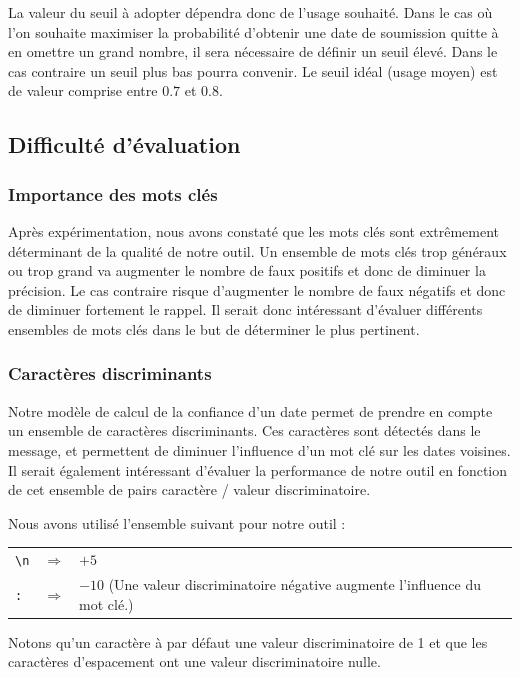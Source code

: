 \documentclass[a4paper,french,10pt]{article}
\begin{document}
La valeur du seuil à adopter dépendra donc de l'usage souhaité. Dans le cas où l'on souhaite maximiser la probabilité d'obtenir une date de soumission quitte à en omettre un grand nombre, il sera nécessaire de définir un seuil élevé. Dans le cas contraire un seuil plus bas pourra convenir. Le seuil idéal (usage moyen) est de valeur comprise entre $0.7$ et $0.8$.

\subsection{Difficulté d'évaluation}

\subsubsection{Importance des mots clés}
Après expérimentation, nous avons constaté que les mots clés sont extrêmement déterminant de la qualité de notre outil. Un ensemble de mots clés trop généraux ou trop grand va augmenter le nombre de faux positifs et donc de diminuer la précision. Le cas contraire risque d'augmenter le nombre de faux négatifs et donc de diminuer fortement le rappel. Il serait donc intéressant d'évaluer différents ensembles de mots clés dans le but de déterminer le plus pertinent.

\subsubsection{Caractères discriminants}
Notre modèle de calcul de la confiance d'un date permet de prendre en compte un ensemble de caractères discriminants. Ces caractères sont détectés dans le message, et permettent de diminuer l'influence d'un mot clé sur les dates voisines. Il serait également intéressant d'évaluer la performance de notre outil en fonction de cet ensemble de pairs caractère / valeur discriminatoire.

Nous avons utilisé l'ensemble suivant pour notre outil :

\begin{tabular}{l c l}
\verb+\n+ & $\Rightarrow$ & $+5$ \\
\verb+:+ & $\Rightarrow$ & $-10$ (Une valeur discriminatoire négative augmente l'influence du mot clé.)\\
\end{tabular}

Notons qu'un caractère à par défaut une valeur discriminatoire de 1 et que les caractères d'espacement ont une valeur discriminatoire nulle.
\end{document}
